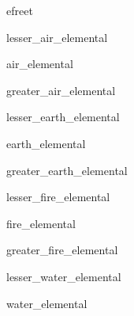 \documentclass[letterpaper,serif]{module}
\begin{document}
\begin{newmonster}{efreet}\end{newmonster}


\begin{newmonster}{lesser_air_elemental}\end{newmonster}

\begin{newmonster}{air_elemental}\end{newmonster}

\begin{newmonster}{greater_air_elemental}\end{newmonster}

\begin{newmonster}{lesser_earth_elemental}\end{newmonster}

\begin{newmonster}{earth_elemental}\end{newmonster}

\begin{newmonster}{greater_earth_elemental}\end{newmonster}

\begin{newmonster}{lesser_fire_elemental}\end{newmonster}

\begin{newmonster}{fire_elemental}\end{newmonster}

\begin{newmonster}{greater_fire_elemental}\end{newmonster}

\begin{newmonster}{lesser_water_elemental}\end{newmonster}

\begin{newmonster}{water_elemental}\end{newmonster}
\end{document}
